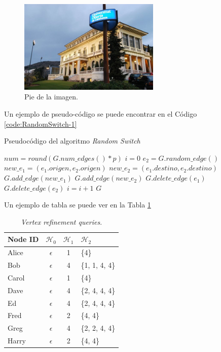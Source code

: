 \begin{figure}
	\centering
	\includegraphics[width=0.6\textwidth]{figs/image1.png}
	\caption{Pie de la imagen.}
	\label{fig:context-anoni1}
\end{figure}



Un ejemplo de pseudo-código se puede encontrar en el Código \ref{code:RandomSwitch-1}

\begin{algorithm}
	\caption{Pseudocódigo del algoritmo \textit{Random Switch}}
	\label{code:RandomSwitch-1}
	\begin{algorithmic}
		\STATE $num = round(G.num\_edges() * p)$
		\STATE $i = 0$
		\STATE $e_{2} = G.random\_edge()$
		\STATE $new\_e_{1} = (e_{1}.origen, e_{2}.origen)$
		\STATE $new\_e_{2} = (e_{1}.destino, e_{2}.destino)$
		\STATE $G.add\_edge(new\_e_{1})$
		\STATE $G.add\_edge(new\_e_{2})$
		\STATE $G.delete\_edge(e_{1})$
		\STATE $G.delete\_edge(e_{2})$
		\STATE $i=i+1$
		\ENDIF
		\ENDWHILE
		\RETURN $G$
	\end{algorithmic}
\end{algorithm}

Un ejemplo de tabla se puede ver en la Tabla \ref{table:ejemplo_vertex_refi_query}

\begin{table}
	\centering{}
	\begin{tabular}{ l || c | c | l }
		\hline
		Node ID & $\mathcal{H}_{0}$ & $\mathcal{H}_{1}$ & $\mathcal{H}_{2}$ \\
		\hline
		\hline
		Alice & $\epsilon$ & 1 & \{4\}  \\
		\hline
		Bob & $\epsilon$ & 4 & \{1, 1, 4, 4\}  \\
		\hline
		Carol & $\epsilon$ & 1 & \{4\}  \\
		\hline
		Dave & $\epsilon$ & 4 & \{2, 4, 4, 4\}  \\
		\hline
		Ed & $\epsilon$ & 4 & \{2, 4, 4, 4\}  \\
		\hline
		Fred & $\epsilon$ & 2 & \{4, 4\}  \\
		\hline
		Greg & $\epsilon$ & 4 & \{2, 2, 4, 4\}  \\
		\hline
		Harry & $\epsilon$ & 2 & \{4, 4\}  \\
		\hline
	\end{tabular}
	\caption{\textit{Vertex refinement queries}.}
	\label{table:ejemplo_vertex_refi_query}
\end{table}
\fi